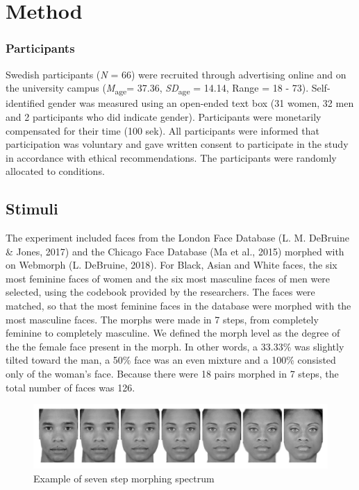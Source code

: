 \documentclass[
  man]{apa7}
\begin{document}
\hypertarget{method}{%
\section{Method}\label{method}}

\hypertarget{participants}{%
\subsubsection{Participants}\label{participants}}

Swedish participants (\emph{N} = 66) were recruited through advertising online and on the university campus (\emph{M}\textsubscript{age}= 37.36, \emph{SD}\textsubscript{age} = 14.14, Range = 18 - 73). Self-identified gender was measured using an open-ended text box (31 women, 32 men and 2 participants who did indicate gender). Participants were monetarily compensated for their time (100 sek). All participants were informed that participation was voluntary and gave written consent to participate in the study in accordance with ethical recommendations. The participants were randomly allocated to conditions.

\hypertarget{stimuli}{%
\subsection{Stimuli}\label{stimuli}}

The experiment included faces from the London Face Database (L. M. DeBruine \& Jones, 2017) and the Chicago Face Database (Ma et al., 2015) morphed with on Webmorph (L. DeBruine, 2018). For Black, Asian and White faces, the six most feminine faces of women and the six most masculine faces of men were selected, using the codebook provided by the researchers. The faces were matched, so that the most feminine faces in the database were morphed with the most masculine faces. The morphs were made in 7 steps, from completely feminine to completely masculine. We defined the morph level as the degree of the the female face present in the morph. In other words, a 33.33\% was slightly tilted toward the man, a 50\% face was an even mixture and a 100\% consisted only of the woman's face. Because there were 18 pairs morphed in 7 steps, the total number of faces was 126.

\begin{figure}
\hypertarget{fig-stimuli}{%
\centering
\includegraphics{pix/stimuli.jpeg}
\caption{Example of seven step morphing spectrum}\label{fig-stimuli}
}
\end{figure}
\end{document}
